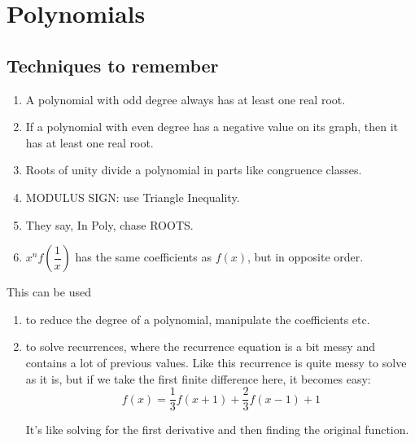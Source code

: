 \newpage
\section{Polynomials}
	
	
	\subsection{Techniques to remember}
	
		\begin{take_note*}{}
			\begin{enumerate}[wide=0em, label=\arabic*, itemsep=10pt, parsep=5pt, font=\bfseries]
				\item A polynomial with odd degree always has at least one real root.
				\item If a polynomial with even degree has a negative value on its graph, then it has at least one real root.
				\item Roots of unity divide a polynomial in parts like congruence classes.
				\item MODULUS SIGN: use Triangle Inequality.
				\item They say, In Poly, chase ROOTS.
				\item $ x^nf(\dfrac{1}{x}) $ has the same coefficients as $ f(x) $, but in opposite order.
			\end{enumerate}
		\end{take_note*}
	
	
	
			
		\label{finite_difference}
		
		\begin{Remark}
			This can be used 
			\begin{enumerate}
				\item to reduce the degree of a polynomial, manipulate the coefficients etc.
				\item to solve recurrences, where the recurrence equation is a bit messy and contains a lot of previous values. Like this recurrence is quite messy to solve as it is, but if we take the first finite difference here, it becomes easy:\[f(x) = \frac{1}{3} f(x+1) + \frac{2}{3} f(x-1) + 1\]
				
				It's like solving for the first derivative and then finding the original function.
			\end{enumerate}
		\end{Remark}
		
